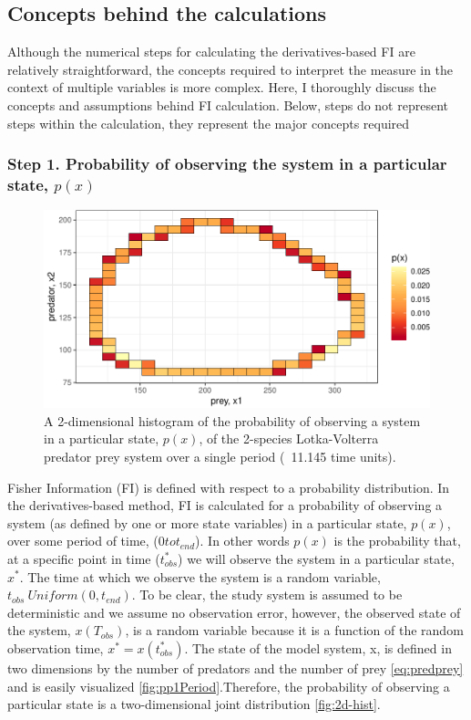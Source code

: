 \documentclass[12pt,twoside,openany]{reedthesis}
\begin{document}
\subsection{Concepts behind the
calculations}\label{concepts-behind-the-calculations}

Although the numerical steps for calculating the derivatives-based FI
are relatively straightforward, the concepts required to interpret the
measure in the context of multiple variables is more complex. Here, I
thoroughly discuss the concepts and assumptions behind FI calculation.
Below, steps do not represent steps within the calculation, they
represent the major concepts required

\subsubsection{\texorpdfstring{\textbf{Step 1. Probability of observing
the system in a particular state,
\(p(x)\)}}{Step 1. Probability of observing the system in a particular state, p(x)}}\label{step-1.-probability-of-observing-the-system-in-a-particular-state-px}
\begin{figure}
\includegraphics[width=0.85\linewidth]{_myDissertation_files/figure-latex/2D-hist-1} \caption{A 2-dimensional histogram of the probability of observing a system in a particular state, $p(x)$, of the 2-species Lotka-Volterra predator prey system over a single period (~11.145 time units).}\label{fig:2D-hist}
\end{figure}
Fisher Information (FI) is defined with respect to a probability
distribution. In the derivatives-based method, FI is calculated for a
probability of observing a system (as defined by one or more state
variables) in a particular state, \(p(x)\), over some period of time,
(\(0 to t_{end}\)). In other words \(p(x)\) is the probability that, at
a specific point in time (\(t_{obs}^*\)) we will observe the system in a
particular state, \(x^*\). The time at which we observe the system is a
random variable, \(t_{obs} ~ Uniform(0,t_{end})\). To be clear, the
study system is assumed to be deterministic and we assume no observation
error, however, the observed state of the system, \(x(T_{obs})\), is a
random variable because it is a function of the random observation time,
\(x^*= x(t_{obs}^*)\). The state of the model system, x, is defined in
two dimensions by the number of predators and the number of prey
\eqref{eq:predprey} and is easily visualized
\ref{fig:pp1Period}.Therefore, the probability of observing a particular
state is a two-dimensional joint distribution \ref{fig:2d-hist}.
\end{document}
